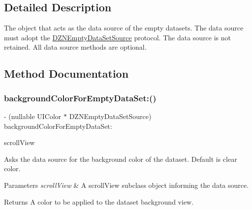 \subsection{Detailed Description}
The object that acts as the data source of the empty datasets.  The data source must adopt the \mbox{\hyperlink{class_d_z_n_empty_data_set_source-p}{D\+Z\+N\+Empty\+Data\+Set\+Source}} protocol. The data source is not retained. All data source methods are optional. 

\subsection{Method Documentation}
\mbox{\label{protocol_d_z_n_empty_data_set_source_01-p_a8ae5fff49c59b843c3daee5116827b8d}} 
\subsubsection{\texorpdfstring{background\+Color\+For\+Empty\+Data\+Set\+:()}{backgroundColorForEmptyDataSet:()}}
{\footnotesize\ttfamily -\/ (nullable U\+I\+Color $\ast$ D\+Z\+N\+Empty\+Data\+Set\+Source) background\+Color\+For\+Empty\+Data\+Set\+: \begin{DoxyParamCaption}\item[{(U\+I\+Scroll\+View $\ast$)}]{scroll\+View }\end{DoxyParamCaption}\hspace{0.3cm}{\ttfamily [optional]}}

Asks the data source for the background color of the dataset. Default is clear color.


\begin{DoxyParams}{Parameters}
{\em scroll\+View} & A scroll\+View subclass object informing the data source. \\
\hline
\end{DoxyParams}
\begin{DoxyReturn}{Returns}
A color to be applied to the dataset background view. 
\end{DoxyReturn}
\mbox{\label{protocol_d_z_n_empty_data_set_source_01-p_ab68e6128a6179741e05f63233c859ba9}} 
